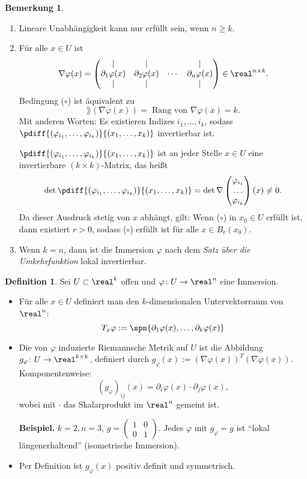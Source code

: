 \documentclass[
 a4paper,
 12pt,
 parskip=half
 ]{scrartcl}
\theoremstyle{plain}
\theoremstyle{definition}
\newtheorem*{defn}{Definition}
\newtheorem*{rmrk}{Bemerkung}
\numberwithin{equation}{section}
\begin{document}
\begin{rmrk}
 \begin{enumerate}
  \item Lineare Unabhängigkeit kann nur erfüllt sein, wenn $n \ge k$.
  \item Für alle $x \in U$ ist 
   \[ \nabla\varphi(x) = \begin{pmatrix} |&|&&|\\ \partial_1 \varphi(x) & \partial_2 \varphi(x) & \cdots & \partial_n \varphi(x) \\|&|&&| \end{pmatrix} \in \real^{n \times k}.\]
   Bedingung ($\circ$) ist äquivalent zu
   \[ \rang( \nabla \varphi(x) ) = \text{ Rang von } \nabla \varphi(x) = k. \]
   Mit anderen Worten: Es existieren Indizes $i_1, \ldots, i_k$, sodass $\pdiff{(\varphi_{i_1}, \ldots, \varphi_{i_k})}{(x_1, \ldots, x_k)}$ invertierbar ist.
   
   $\pdiff{(\varphi_{i_1}, \ldots, \varphi_{i_k})}{(x_1, \ldots, x_k)}$ ist an jeder Stelle $x \in U$ eine invertierbare $(k \times k)$-Matrix, das heißt 
   \[ \det \pdiff{(\varphi_{i_1}, \ldots, \varphi_{i_k})}{(x_1, \ldots, x_k)} = \det \nabla \begin{pmatrix} \varphi_{i_1} \\ \ldots \\ \varphi_{i_k} \end{pmatrix}(x) \ne 0. \]
   Da dieser Ausdruck stetig von $x$ abhängt, gilt: Wenn ($\circ$) in $x_0 \in U$ erfüllt ist, dann existiert $r > 0$, sodass ($\circ$) erfüllt ist für alle $x \in B_r(x_0)$.
  \item Wenn $k=n$, dann ist die Immersion $\varphi$ nach dem \emph{Satz über die Umkehrfunktion} lokal invertierbar.
 \end{enumerate}
\end{rmrk}

\begin{defn}
 Sei $U \subset \real^k$ offen und $\varphi\colon U \to \real^n$ eine Immersion.
 \begin{itemize}
  \item Für alle $x \in U$ definiert man den $k$-dimensionalen Untervektorraum von $\real^n$:
  \[ T_x \varphi := \spn \{ \partial_1 \varphi(x), \ldots, \partial_k \varphi(x)\} \]
 \item Die von $\varphi$ induzierte Riemannsche Metrik auf $U$ ist die Abbildung $g_\varphi\colon U \to \real^{k \times k}$, definiert durch $g_\varphi(x) := (\nabla \varphi(x))^T (\nabla \varphi(x))$. Komponentenweise:
  \[ (g_\varphi)_{ij}(x) = \partial_i \varphi(x) \cdot \partial_j \varphi(x), \]
  wobei mit $\cdot$ das Skalarprodukt im $\real^n$ gemeint ist.
 
  \textbf{Beispiel.} $k=2, n=3$, $g = \begin{pmatrix} 1 & 0 \\ 0 & 1 \end{pmatrix}$. Jedes $\varphi$ mit $g_\varphi = g$ ist ``lokal längenerhaltend'' (isometrische Immersion).
 \item Per Definition ist $g_\varphi(x)$ positiv definit und symmetrisch.
 \end{itemize}
\end{defn}
\end{document}

